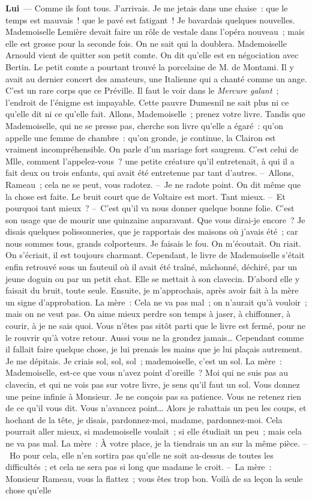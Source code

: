\documentclass[french,twoside]{book} %
\newcommand{\labelchar}[1]{\textbf{\color{rubric} #1}}
\begin{document}
\labelchar{Lui} — Comme ils font tous. J’arrivais. Je me jetais dans une chaise : que le temps est mauvais ! que le pavé est fatigant ! Je bavardais quelques nouvelles. Mademoiselle Lemière devait faire un rôle de vestale dans l’opéra nouveau ; mais elle est grosse pour la seconde fois. On ne sait qui la doublera. Mademoiselle Arnould vient de quitter son petit comte. On dit qu’elle est en négociation avec Bertin. Le petit comte a pourtant trouvé la porcelaine de M. de Montami. Il y avait au dernier concert des amateurs, une Italienne qui a chanté comme un ange. C’est un rare corps que ce Préville. Il faut le voir dans le \emph{Mercure galant} ; l’endroit de l’énigme est impayable. Cette pauvre Dumesnil ne sait plus ni ce qu’elle dit ni ce qu’elle fait. Allons, Mademoiselle ; prenez votre livre. Tandis que Mademoiselle, qui ne se presse pas, cherche son livre qu’elle a égaré : qu’on appelle une femme de chambre : qu’on gronde, je continue, la Clairon est vraiment incompréhensible. On parle d’un mariage fort saugrenu. C’est celui de Mlle, comment l’appelez-vous ? une petite créature qu’il entretenait, à qui il a fait deux ou trois enfants, qui avait été entretenue par tant d’autres. – Allons, Rameau ; cela ne se peut, vous radotez. – Je ne radote point. On dit même que la chose est faite. Le bruit court que de Voltaire est mort. Tant mieux. – Et pourquoi tant mieux ? – C’est qu’il va nous donner quelque bonne folie. C’est son usage que de mourir une quinzaine auparavant. Que vous dirai-je encore ? Je disais quelques polissonneries, que je rapportais des maisons où j’avais été ; car nous sommes tous, grands colporteurs. Je faisais le fou. On m’écoutait. On riait. On s’écriait, il est toujours charmant. Cependant, le livre de Mademoiselle s’était enfin retrouvé sous un fauteuil où il avait été traîné, mâchonné, déchiré, par un jeune doguin ou par un petit chat. Elle se mettait à son clavecin. D’abord elle y faisait du bruit, toute seule. Ensuite, je m’approchais, après avoir fait à la mère un signe d’approbation. La mère : Cela ne va pas mal ; on n’aurait qu’à vouloir ; mais on ne veut pas. On aime mieux perdre son temps à jaser, à chiffonner, à courir, à je ne sais quoi. Vous n’êtes pas sitôt parti que le livre est fermé, pour ne le rouvrir qu’à votre retour. Aussi vous ne la grondez jamais… Cependant comme il fallait faire quelque chose, je lui prenais les mains que je lui plaçais autrement. Je me dépitais. Je criais sol, sol, sol ; mademoiselle, c’est un sol. La mère : Mademoiselle, est-ce que vous n’avez point d’oreille ? Moi qui ne suis pas au clavecin, et qui ne vois pas sur votre livre, je sens qu’il faut un sol. Vous donnez une peine infinie à Monsieur. Je ne conçois pas sa patience. Vous ne retenez rien de ce qu’il vous dit. Vous n’avancez point… Alors je rabattais un peu les coups, et hochant de la tête, je disais, pardonnez-moi, madame, pardonnez-moi. Cela pourrait aller mieux, si mademoiselle voulait ; si elle étudiait un peu ; mais cela ne va pas mal. La mère : À votre place, je la tiendrais un an sur la même pièce. – Ho pour cela, elle n’en sortira pas qu’elle ne soit au-dessus de toutes les difficultés ; et cela ne sera pas si long que madame le croit. – La mère : Monsieur Rameau, vous la flattez ; vous êtes trop bon. Voilà de sa leçon la seule chose qu’elle 
\end{document}
